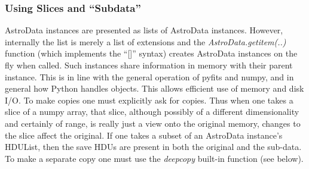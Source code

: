 \documentclass[letterpaper,10pt,english]{sphinxmanual}
\begin{document}
\subsubsection{Using Slices and ``Subdata''}
\label{gen.ADMANUAL-ADSubdata:using-slices-and-subdata}\label{gen.ADMANUAL-ADSubdata::doc}
{\hfill{}\hfill}

AstroData instances are presented as lists of AstroData instances.
However, internally the list is merely a list of extensions and the
\emph{AstroData.getitem(..)} function (which implements the ``{[}{]}'' syntax)
creates AstroData instances on the fly when called. Such instances
share information in memory with their parent instance. This is in
line with the general operation of pyfits and numpy, and in general
how Python handles objects. This allows efficient use of memory and
disk I/O. To make copies one must explicitly ask for copies. Thus when
one takes a slice of a numpy array, that slice, although possibly of a
different dimensionality and certainly of range, is really just a view
onto the original memory, changes to the slice affect the original. If
one takes a subset of an AstroData instance's HDUList, then the save
HDUs are present in both the original and the sub-data. To make a
separate copy one must use the \emph{deepcopy} built-in function (see
below).
\end{document}
